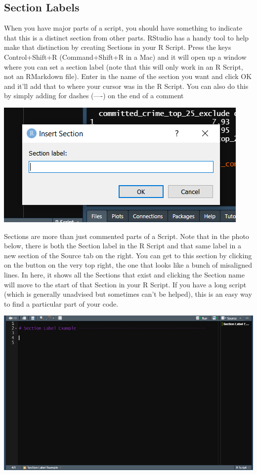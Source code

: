 \documentclass[
  12pt,
]{book}
\begin{document}
\hypertarget{section-labels}{%
\subsection{Section Labels}\label{section-labels}}

When you have major parts of a script, you should have something to indicate that this is a distinct section from other parts. RStudio has a handy tool to help make that distinction by creating Sections in your R Script. Press the keys Control+Shift+R (Command+Shift+R in a Mac) and it will open up a window where you can set a section label (note that this will only work in an R Script, not an RMarkdown file). Enter in the name of the section you want and click OK and it'll add that to where your cursor was in the R Script. You can also do this by simply adding for dashes (----) on the end of a comment

\includegraphics{images/section_label1.PNG}

Sections are more than just commented parts of a Script. Note that in the photo below, there is both the Section label in the R Script and that same label in a new section of the Source tab on the right. You can get to this section by clicking on the button on the very top right, the one that looks like a bunch of misaligned lines. In here, it shows all the Sections that exist and clicking the Section name will move to the start of that Section in your R Script. If you have a long script (which is generally unadvised but sometimes can't be helped), this is an easy way to find a particular part of your code.

\includegraphics{images/section_label2.PNG}
\end{document}
